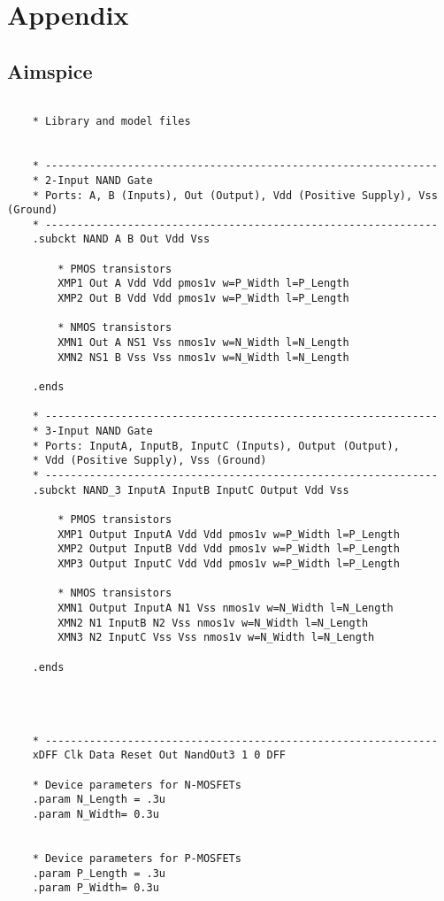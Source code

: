 \section{Appendix}
\subsection{Aimspice}
\begin{lstlisting}

    * Library and model files

                  
    * --------------------------------------------------------------
    * 2-Input NAND Gate
    * Ports: A, B (Inputs), Out (Output), Vdd (Positive Supply), Vss (Ground)
    * --------------------------------------------------------------
    .subckt NAND A B Out Vdd Vss
    
        * PMOS transistors
        XMP1 Out A Vdd Vdd pmos1v w=P_Width l=P_Length 
        XMP2 Out B Vdd Vdd pmos1v w=P_Width l=P_Length 
    
        * NMOS transistors
        XMN1 Out A NS1 Vss nmos1v w=N_Width l=N_Length 
        XMN2 NS1 B Vss Vss nmos1v w=N_Width l=N_Length 
    
    .ends
    
    * --------------------------------------------------------------
    * 3-Input NAND Gate
    * Ports: InputA, InputB, InputC (Inputs), Output (Output), 
    * Vdd (Positive Supply), Vss (Ground)
    * --------------------------------------------------------------
    .subckt NAND_3 InputA InputB InputC Output Vdd Vss
    
        * PMOS transistors
        XMP1 Output InputA Vdd Vdd pmos1v w=P_Width l=P_Length 
        XMP2 Output InputB Vdd Vdd pmos1v w=P_Width l=P_Length
        XMP3 Output InputC Vdd Vdd pmos1v w=P_Width l=P_Length
    
        * NMOS transistors
        XMN1 Output InputA N1 Vss nmos1v w=N_Width l=N_Length 
        XMN2 N1 InputB N2 Vss nmos1v w=N_Width l=N_Length
        XMN3 N2 InputC Vss Vss nmos1v w=N_Width l=N_Length  
    
    .ends
    
    

    
    * --------------------------------------------------------------
    xDFF Clk Data Reset Out NandOut3 1 0 DFF
    
    * Device parameters for N-MOSFETs
    .param N_Length = .3u
    .param N_Width= 0.3u 
    
    
    * Device parameters for P-MOSFETs
    .param P_Length = .3u
    .param P_Width= 0.3u 
    

\end{lstlisting}
